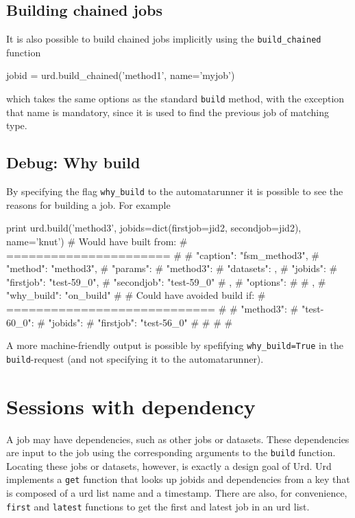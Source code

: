 \subsection{Building chained jobs}
It is also possible to build chained jobs implicitly using the
\texttt{build\_chained} function\\
\begin{python}
  jobid = urd.build_chained('method1', name='myjob')
\end{python}
which takes the same options as the standard \texttt{build} method,
with the exception that name is mandatory, since it is used to find
the previous job of matching type.



\subsection{Debug:  Why build}

By specifying the flag \texttt{why\_build} to the automatarunner it is
possible to see the reasons for building a job.  For example\\
\begin{python}
  print urd.build('method3', jobids=dict(firstjob=jid2, secondjob=jid2), name='knut')
# Would have built from:
# ======================
# {
#     "caption": "fsm_method3", 
#     "method": "method3", 
#     "params": {
#         "method3": {
#             "datasets": {}, 
#             "jobids": {
#                 "firstjob": "test-59_0", 
#                 "secondjob": "test-59_0"
#             }, 
#             "options": {}
#         }
#     }, 
#     "why_build": "on_build"
# }
# Could have avoided build if:
# ============================
# {
#     "method3": {
#         "test-60_0": {
#             "jobids": {
#                 "firstjob": "test-56_0"
#             }
#         }
#     }
# }
\end{python}
A more machine-friendly output is possible by spefifying
\texttt{why\_build=True} in the \texttt{build}-request (and not
specifying it to the automatarunner).



\newpage
\section{Sessions with dependency}

A job may have dependencies, such as other jobs or datasets.  These
dependencies are input to the job using the corresponding arguments to
the \texttt{build} function.  Locating these jobs or datasets,
however, is exactly a design goal of Urd.  Urd implements a
\texttt{get} function that looks up jobids and dependencies from a key
that is composed of a urd list name and a timestamp.  There are also,
for convenience, \texttt{first} and \texttt{latest} functions to get
the first and latest job in an urd list.

